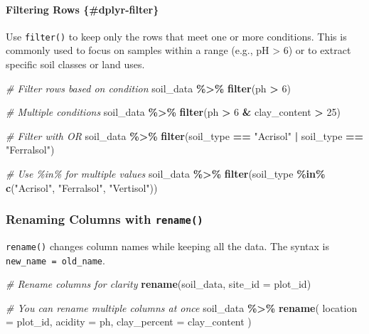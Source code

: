 \documentclass[
  10pt,
  b5paper,
  oneside]{book}
\newenvironment{Shaded}{\begin{snugshade}}{\end{snugshade}}
\newcommand{\AttributeTok}[1]{\textcolor[rgb]{0.13,0.29,0.53}{#1}}
\newcommand{\CommentTok}[1]{\textcolor[rgb]{0.56,0.35,0.01}{\textit{#1}}}
\newcommand{\DecValTok}[1]{\textcolor[rgb]{0.00,0.00,0.81}{#1}}
\newcommand{\FunctionTok}[1]{\textcolor[rgb]{0.13,0.29,0.53}{\textbf{#1}}}
\newcommand{\NormalTok}[1]{#1}
\newcommand{\SpecialCharTok}[1]{\textcolor[rgb]{0.81,0.36,0.00}{\textbf{#1}}}
\newcommand{\StringTok}[1]{\textcolor[rgb]{0.31,0.60,0.02}{#1}}
\begin{document}
\paragraph*{Filtering Rows \{\#dplyr-filter\}}\label{filtering-rows-dplyr-filter}

Use \texttt{filter()} to keep only the rows that meet one or more conditions. This is commonly used to focus on samples within a range (e.g., pH \textgreater{} 6) or to extract specific soil classes or land uses.

\begin{Shaded}
\begin{Highlighting}[]
\CommentTok{\# Filter rows based on condition}
\NormalTok{soil\_data }\SpecialCharTok{\%\textgreater{}\%}
  \FunctionTok{filter}\NormalTok{(ph }\SpecialCharTok{\textgreater{}} \DecValTok{6}\NormalTok{)}

\CommentTok{\# Multiple conditions}
\NormalTok{soil\_data }\SpecialCharTok{\%\textgreater{}\%}
  \FunctionTok{filter}\NormalTok{(ph }\SpecialCharTok{\textgreater{}} \DecValTok{6} \SpecialCharTok{\&}\NormalTok{ clay\_content }\SpecialCharTok{\textgreater{}} \DecValTok{25}\NormalTok{)}

\CommentTok{\# Filter with OR}
\NormalTok{soil\_data }\SpecialCharTok{\%\textgreater{}\%}
  \FunctionTok{filter}\NormalTok{(soil\_type }\SpecialCharTok{==} \StringTok{"Acrisol"} \SpecialCharTok{|}\NormalTok{ soil\_type }\SpecialCharTok{==} \StringTok{"Ferralsol"}\NormalTok{)}

\CommentTok{\# Use \%in\% for multiple values}
\NormalTok{soil\_data }\SpecialCharTok{\%\textgreater{}\%}
  \FunctionTok{filter}\NormalTok{(soil\_type }\SpecialCharTok{\%in\%} \FunctionTok{c}\NormalTok{(}\StringTok{"Acrisol"}\NormalTok{, }\StringTok{"Ferralsol"}\NormalTok{, }\StringTok{"Vertisol"}\NormalTok{))}
\end{Highlighting}
\end{Shaded}

\subsubsection{\texorpdfstring{Renaming Columns with \texttt{rename()}}{Renaming Columns with rename()}}\label{dplyr-rename}

\texttt{rename()} changes column names while keeping all the data.
The syntax is \texttt{new\_name\ =\ old\_name}.

\begin{Shaded}
\begin{Highlighting}[]
\CommentTok{\# Rename columns for clarity}
\FunctionTok{rename}\NormalTok{(soil\_data,}
    \AttributeTok{site\_id =}\NormalTok{ plot\_id)}

\CommentTok{\# You can rename multiple columns at once}
\NormalTok{soil\_data }\SpecialCharTok{\%\textgreater{}\%}
 \FunctionTok{rename}\NormalTok{(}
  \AttributeTok{location =}\NormalTok{ plot\_id,}
  \AttributeTok{acidity =}\NormalTok{ ph,}
  \AttributeTok{clay\_percent =}\NormalTok{ clay\_content}
\NormalTok{ ) }
\end{Highlighting}
\end{Shaded}
\end{document}
